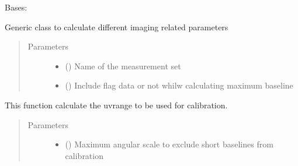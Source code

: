 \documentclass[letterpaper,10pt,english]{sphinxmanual}
\begin{document}

\begin{fulllineitems}
\label{\detokenize{paircars:paircars.basic_func.ImageBasic}}
\sphinxAtStartPar
Bases: 

\sphinxAtStartPar
Generic class to calculate different imaging related parameters
\begin{quote}\begin{description}
\item[{Parameters}] \leavevmode\begin{itemize}
\item {} 
\sphinxAtStartPar
{} () \textendash{} Name of the measurement set

\item {} 
\sphinxAtStartPar
{} () \textendash{} Include flag data or not whilw calculating maximum baseline

\end{itemize}

\end{description}\end{quote}

\begin{fulllineitems}
\label{\detokenize{paircars:paircars.basic_func.ImageBasic.calc_calib_uvrange}}
\sphinxAtStartPar
This function calculate the uvrange to be used for calibration.
\begin{quote}\begin{description}
\item[{Parameters}] \leavevmode\begin{itemize}
\item {} 
\sphinxAtStartPar
{} () \textendash{} Maximum angular scale to exclude short baselines from calibration


\end{itemize}
\end{description}
\end{quote}
\end{fulllineitems}
\end{fulllineitems}
\end{document}
